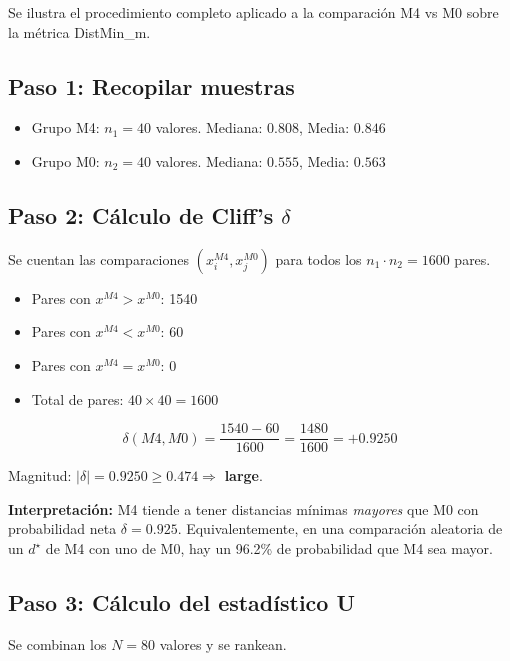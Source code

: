 \documentclass[12pt,a4paper,oneside]{book}
\begin{document}
Se ilustra el procedimiento completo aplicado a la comparación M4 vs M0 sobre la métrica DistMin\_m.

\subsection{Paso 1: Recopilar muestras}

\begin{itemize}
    \item Grupo M4: $n_1 = 40$ valores. Mediana: $0.808$, Media: $0.846$
    \item Grupo M0: $n_2 = 40$ valores. Mediana: $0.555$, Media: $0.563$
\end{itemize}

\subsection{Paso 2: Cálculo de Cliff's $\delta$}

Se cuentan las comparaciones $(x_i^{M4}, x_j^{M0})$ para todos los $n_1 \cdot n_2 = 1600$ pares.


\begin{itemize}
    \item Pares con $x^{M4} > x^{M0}$: 1540
    \item Pares con $x^{M4} < x^{M0}$: 60
    \item Pares con $x^{M4} = x^{M0}$: 0
    \item Total de pares: $40\times40 = 1600$
\end{itemize}

\begin{equation}
\delta(M4, M0) = \frac{1540 - 60}{1600} = \frac{1480}{1600} = \boxed{+0.9250}
\end{equation}

Magnitud: $|\delta| = 0.9250 \geq 0.474 \Rightarrow$ \textbf{large}.

\textbf{Interpretación:} M4 tiende a tener distancias mínimas \emph{mayores} que M0 con probabilidad neta $\delta = 0.925$. Equivalentemente, en una comparación aleatoria de un $d^\star$ de M4 con uno de M0, hay un 96.2\% de probabilidad que M4 sea mayor.

\subsection{Paso 3: Cálculo del estadístico U}

Se combinan los $N = 80$ valores y se rankean.
\end{document}
